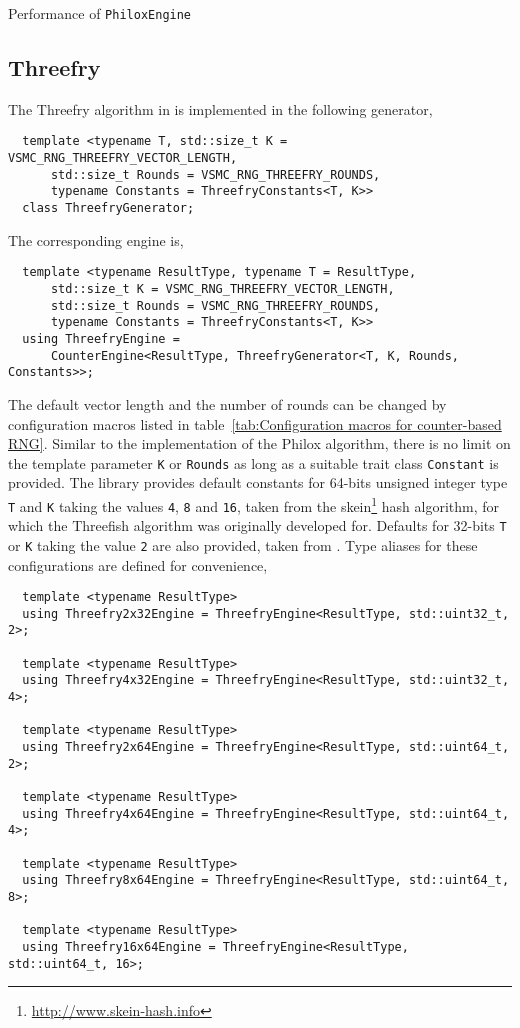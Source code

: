\begin{table}
  \caption{Performance of \protect\texttt{PhiloxEngine}}
  \label{tab:Performance of PhiloxEngine}
\end{table}

\subsection{Threefry}
\label{sub:Threefry}

The Threefry algorithm in \textcite{Salmon:2011um} is implemented in the
following generator,
\begin{Verbatim}
  template <typename T, std::size_t K = VSMC_RNG_THREEFRY_VECTOR_LENGTH,
      std::size_t Rounds = VSMC_RNG_THREEFRY_ROUNDS,
      typename Constants = ThreefryConstants<T, K>>
  class ThreefryGenerator;
\end{Verbatim}
The corresponding \rng engine is,
\begin{Verbatim}
  template <typename ResultType, typename T = ResultType,
      std::size_t K = VSMC_RNG_THREEFRY_VECTOR_LENGTH,
      std::size_t Rounds = VSMC_RNG_THREEFRY_ROUNDS,
      typename Constants = ThreefryConstants<T, K>>
  using ThreefryEngine =
      CounterEngine<ResultType, ThreefryGenerator<T, K, Rounds, Constants>>;
\end{Verbatim}
The default vector length and the number of rounds can be changed by
configuration macros listed in table~\ref{tab:Configuration macros for
  counter-based RNG}. Similar to the implementation of the Philox algorithm,
there is no limit on the template parameter \verb|K| or \verb|Rounds| as long
as a suitable trait class \verb|Constant| is provided. The library provides
default constants for 64-bits unsigned integer type \verb|T| and \verb|K|
taking the values \verb|4|, \verb|8| and \verb|16|, taken from the
skein\footnote{\url{http://www.skein-hash.info}} hash algorithm, for which the
Threefish algorithm was originally developed for. Defaults for 32-bits \verb|T|
or \verb|K| taking the value \verb|2| are also provided, taken from
\textcite{Salmon:2011um}. Type aliases for these configurations are defined for
convenience,
\begin{Verbatim}
  template <typename ResultType>
  using Threefry2x32Engine = ThreefryEngine<ResultType, std::uint32_t, 2>;

  template <typename ResultType>
  using Threefry4x32Engine = ThreefryEngine<ResultType, std::uint32_t, 4>;

  template <typename ResultType>
  using Threefry2x64Engine = ThreefryEngine<ResultType, std::uint64_t, 2>;

  template <typename ResultType>
  using Threefry4x64Engine = ThreefryEngine<ResultType, std::uint64_t, 4>;

  template <typename ResultType>
  using Threefry8x64Engine = ThreefryEngine<ResultType, std::uint64_t, 8>;

  template <typename ResultType>
  using Threefry16x64Engine = ThreefryEngine<ResultType, std::uint64_t, 16>;
\end{Verbatim}
